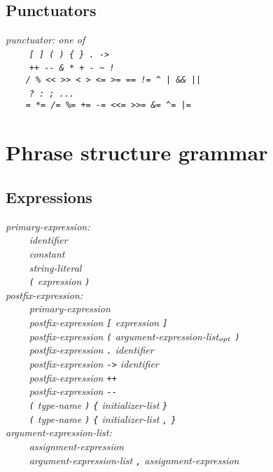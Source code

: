 \documentclass[12pt]{report}
\def\|{\verb|}
\newcommand\opt{$_{{\it opt}}$ }
\begin{document}
\rm
\section{Punctuators}
\it
\noindent
punctuator: {\rm one of}\\
\|    | \verb+[ ] ( ) { } . ->+\\
\|    | \verb|++ -- & * + - ~ !|\\
\|    | \verb+/ % << >> < > <= >= == != ^ | && ||+\\
\|    | \verb+? : ; ...+\\
\|    | \verb#= *= /= %= += -= <<= >>= &= ^= |=#\\

\rm
\chapter{Phrase structure grammar}
\section{Expressions}
\it
\noindent
primary-expression:\\
\|    | identifier\\
\|    | constant\\
\|    | string-literal\\
\|    | \verb+(+ expression \verb+)+\\

\noindent
postfix-expression:\\
\|    | primary-expression\\
\|    | postfix-expression \verb+[+ expression \verb+]+\\
\|    | postfix-expression \verb+(+ argument-expression-list\opt \verb+)+\\
\|    | postfix-expression \verb+.+ identifier\\
\|    | postfix-expression \verb+->+ identifier\\
\|    | postfix-expression \verb|++|\\
\|    | postfix-expression \verb+--+\\
\|    | \verb+(+ type-name \verb+)+ \verb+{+ initializer-list \verb+}+\\
\|    | \verb+(+ type-name \verb+)+ \verb+{+ initializer-list \verb+,+ \verb+}+\\

\noindent
argument-expression-list:\\
\|    | assignment-expression\\
\|    | argument-expression-list \verb+,+ assignment-expression\\
\end{document}
